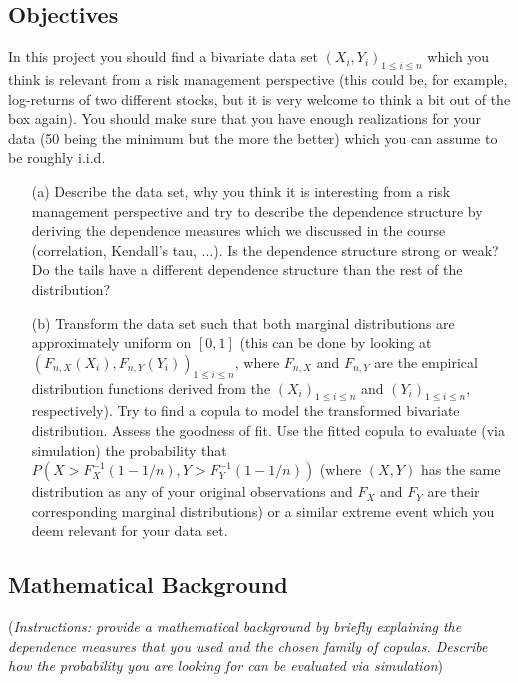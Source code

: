 \documentclass[11pt]{article}
\begin{document}
\subsection*{Objectives}
In this project you should find a bivariate data set $(X_i, Y_i)_{1 \leq i \leq n}$ which you think is relevant from a risk management perspective (this could be, for example, log-returns of two different stocks, but it is very welcome to think a bit out of the box again). You should make sure that you have enough realizations for your data (50 being the minimum but the more the better) which you can assume to be roughly i.i.d.\ 
\begin{itemize}
\item[(a)] Describe the data set, why you think it is interesting from a risk management perspective and try to describe the dependence structure by deriving the dependence measures which we discussed in the course (correlation, Kendall's tau, ...). Is the dependence structure strong or weak? Do the tails have a different dependence structure than the rest of the distribution?
\item[(b)] Transform the data set such that both marginal distributions are approximately uniform on $[0,1]$ (this can be done by looking at $(F_{n,X}(X_i), F_{n,Y}(Y_i))_{1 \leq i \leq n}$, where $F_{n, X}$ and $F_{n,Y}$ are the empirical distribution functions derived from the $(X_i)_{1 \leq i \leq n }$ and $(Y_i)_{1 \leq i \leq n }$, respectively). Try to find a copula to model the transformed bivariate distribution. Assess the goodness of fit. Use the fitted copula to evaluate (via simulation) the probability that $P(X>F_X^{-1}(1-1/n), Y>F_Y^{-1}(1-1/n))$ (where $(X,Y)$ has the same distribution as any of your original observations and $F_X$ and $F_Y$ are their corresponding marginal distributions) or a similar extreme event which you deem relevant for your data set. 
\end{itemize}

\subsection*{Mathematical Background}
({\it Instructions: provide a mathematical background by briefly explaining the dependence measures that you used and the chosen family of copulas. Describe how the probability you are looking for can be evaluated via simulation})
\end{document}
